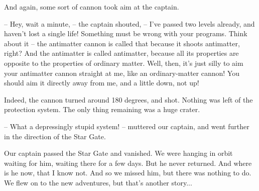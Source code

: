 \documentclass[ebook,twoside,final,openright]{memoir}
\begin{document}
And again, some sort of cannon took aim at the captain.\par
– Hey, wait a minute, – the captain shouted, – I’ve passed two levels already, and haven’t lost a single life! Something must be wrong with your programs. Think about it – the antimatter cannon is called that because it shoots antimatter, right? And the antimatter is called antimatter, because all its properties are opposite to the properties of ordinary matter. Well, then, it’s just silly to aim your antimatter cannon straight at me, like an ordinary-matter cannon! You should aim it directly away from me, and a little down, not up!\par
\par
Indeed, the cannon turned around 180 degrees, and shot. Nothing was left of the protection system. The only thing remaining was a huge crater.\par
– What a depressingly stupid system! – muttered our captain, and went further in the direction of the Star Gate.\par
\par
Our captain passed the Star Gate and vanished. We were hanging in orbit waiting for him, waiting there for a few days. But he never returned. And where is he now, that I know not. And so we missed him, but there was nothing to do. We flew on to the new adventures, but that's another story...
\end{document}
